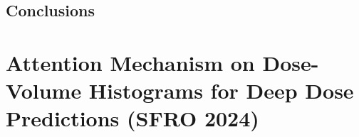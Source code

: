 \subsection{Conclusions}






\section{Attention Mechanism on Dose-Volume Histograms for Deep Dose Predictions (SFRO 2024)}
